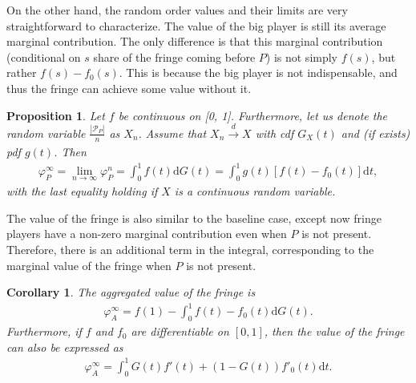 \documentclass[a4paper]{article}
\newtheorem{proposition}{Proposition}
\newtheorem{corollary}{Corollary}
\newcommand{\dt}{\mathrm{d}t}
\newcommand{\dG}{\mathrm{d}G}
\begin{document}
On the other hand, the random order values and their limits are very straightforward to characterize.
The value of the big player is still its average marginal contribution.
The only difference is that this marginal contribution (conditional on $s$ share of the fringe coming before $P$) is not simply $f(s)$, but rather $f(s) - f_0(s)$.
This is because the big player is not indispensable, and thus the fringe can achieve some value without it.

\begin{proposition}
    \label{prop:one_sided_non_indispensable}
    Let $f$ be continuous on [0, 1]. Furthermore, let us denote the random variable $\frac{|\mathcal{P}_P|}{n}$ as $X_n$. Assume that $X_n \xrightarrow[]{d} X$ with cdf $G_X(t)$ and (if exists) pdf $g(t)$.
    Then
    \begin{align*}
        \varphi_P^\infty = \lim_{n \to \infty} \varphi_P^n = \int_0^1 f(t) \dG(t) = \int_0^1 g(t) [f(t) - f_0(t)] \dt,
    \end{align*}
    with the last equality holding if $X$ is a continuous random variable.
\end{proposition}

The value of the fringe is also similar to the baseline case, except now fringe players have a non-zero marginal contribution even when $P$ is not present.
Therefore, there is an additional term in the integral, corresponding to the marginal value of the fringe when $P$ is not present.

\begin{corollary}
    \label{cor:fringe_value_non_indispensable}
    The aggregated value of the fringe is
    \begin{align*}
        \varphi_A^\infty = f(1) - \int_0^1 f(t) - f_0(t) \dG(t).
    \end{align*}
    Furthermore, if $f$ and $f_0$ are differentiable on $[0, 1]$, then the value of the fringe can also be expressed as
    \begin{align*}
        \varphi_A^\infty = \int_0^1 G(t) f'(t) + (1 - G(t)) f'_0(t) \dt.
    \end{align*}
\end{corollary}
\end{document}
